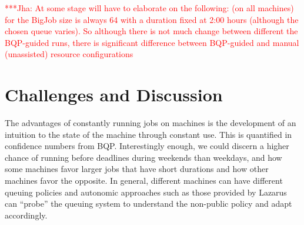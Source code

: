 \documentclass{sig-alternate}
\newcommand{\up}{\vspace*{-0.3em}}
\newcommand{\jhanote}[1]{ {\textcolor{red} { ***Jha: #1 }}}
\newcommand{\jhanote}[1]{}
\begin{document}
\up\up
\begin{table}
\caption{Table showing  the selected configuration of the resources
  and the numer of times a particular configuration is chosen, when 
  the decision is guided by BzaQP. Data in this table corresponds to
  RQA-BQP; the experiments are repeated ten times. As can be seen, 
  the use of BQP results in a varying choice of resource  configuration on  different machines.  In contrast, when BQP is not used, a fixed configuration
  is employed.}\up\up\up\up\up\up
\end{table}

\jhanote{At some stage will have to elaborate on the following: (on all machines) for the BigJob size is always 64 with a duration fixed at 2:00 hours (although the chosen queue varies). So although there is not much change between different the BQP-guided runs, there is significant difference between BQP-guided and manual (unassisted) resource configurations}

\section{Challenges and Discussion}

The advantages of constantly running jobs on machines is the
development of an intuition to the state of the machine through
constant use. This is quantified in confidence numbers from
BQP. Interestingly enough, we could discern a higher chance of running
before deadlines during weekends than weekdays, and how some machines
favor larger jobs that have short durations and how other machines
favor the opposite. In general, different machines can have different
queuing policies and autonomic approaches such as those provided by
Lazarus can ``probe'' the queuing system to understand the non-public
policy and adapt accordingly.
\end{document}
